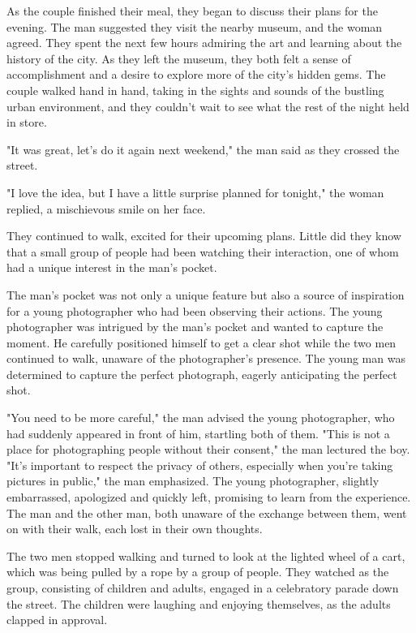 \documentclass[smalldemyvopaper,11pt,twoside,onecolumn,openright,extrafontsizes]{memoir}
\begin{document}
As the couple finished their meal, they began to discuss their plans for the evening. The man suggested they visit the nearby museum, and the woman agreed. They spent the next few hours admiring the art and learning about the history of the city. As they left the museum, they both felt a sense of accomplishment and a desire to explore more of the city's hidden gems. The couple walked hand in hand, taking in the sights and sounds of the bustling urban environment, and they couldn't wait to see what the rest of the night held in store.\par
"It was great, let's do it again next weekend," the man said as they crossed the street.\par
"I love the idea, but I have a little surprise planned for tonight," the woman replied, a mischievous smile on her face.\par
They continued to walk, excited for their upcoming plans. Little did they know that a small group of people had been watching their interaction, one of whom had a unique interest in the man's pocket.\par
The man's pocket was not only a unique feature but also a source of inspiration for a young photographer who had been observing their actions. The young photographer was intrigued by the man's pocket and wanted to capture the moment. He carefully positioned himself to get a clear shot while the two men continued to walk, unaware of the photographer's presence. The young man was determined to capture the perfect photograph, eagerly anticipating the perfect shot.\par
"You need to be more careful," the man advised the young photographer, who had suddenly appeared in front of him, startling both of them. "This is not a place for photographing people without their consent," the man lectured the boy. "It's important to respect the privacy of others, especially when you're taking pictures in public," the man emphasized. The young photographer, slightly embarrassed, apologized and quickly left, promising to learn from the experience. The man and the other man, both unaware of the exchange between them, went on with their walk, each lost in their own thoughts.\par
The two men stopped walking and turned to look at the lighted wheel of a cart, which was being pulled by a rope by a group of people. They watched as the group, consisting of children and adults, engaged in a celebratory parade down the street. The children were laughing and enjoying themselves, as the adults clapped in approval.\par
\end{document}

